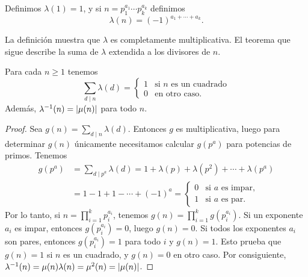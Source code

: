 \documentclass[12pt,a4paper]{book}
\begin{document}
    \begin{definicion}
        Definimos $\lambda(1)=1$, y si $n=p_1^{a_1}\cdots p_k^{a_k}$ definimos
        \begin{equation*}
            \lambda(n)=(-1)^{a_1+\cdots+a_k}.
        \end{equation*}
    \end{definicion}

    La definición muestra que $\lambda$ es completamente multiplicativa. El teorema que
    sigue describe la suma de $\lambda$ extendida a los divisores de $n$.

    \begin{teorema}
        Para cada $n\geq1$ tenemos
        \begin{equation*}
            \sum_{d\mid n}\lambda(d)=
            \begin{cases}
                1 & \text{si } n \text{ es un cuadrado}\\
                0 & \text{en otro caso.}
            \end{cases}
        \end{equation*}
        Además, $\lambda^{-1}(n)=\abs{\mu(n)}$ para todo $n$.
    \end{teorema}

    \begin{proof}
        Sea $g(n)=\sum_{d\mid n}\lambda(d)$. Entonces $g$ es multiplicativa, luego para
        determinar $g(n)$ únicamente necesitamos calcular $g(p^a)$ para potencias de
        primos. Tenemos
        \begin{align*}
            g(p^a)&=\sum_{d\mid p^a}\lambda(d)=1+\lambda(p)+\lambda(p^2)+\cdots+\lambda(p^a)\\
            &=1-1+1-\cdots+(-1)^a=
            \begin{cases}
                0 & \text{si } a \text{ es impar,}\\
                1 & \text{si } a \text{ es par.}
            \end{cases}
        \end{align*}
        Por lo tanto, si $n=\prod_{i=1}^{k}p_i^{a_i}$, tenemos
        $g(n)=\prod_{i=1}^{k}g(p_i^{a_i})$. Si un exponente $a_i$ es impar, entonces
        $g(p_i^{a_i})=0$, luego $g(n)=0$. Si todos los exponentes $a_i$ son pares, entonces
        $g(p_i^{a_i})=1$ para todo $i$ y $g(n)=1$. Esto prueba que $g(n)=1$ si $n$ es un
        cuadrado, y $g(n)=0$ en otro caso. Por consiguiente,
        $\lambda^{-1}(n)=\mu(n)\lambda(n)=\mu^2(n)=\abs{\mu(n)}$.
    \end{proof}
\end{document}
